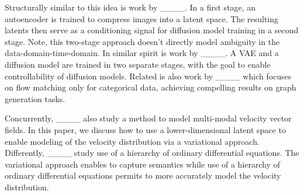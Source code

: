 Structurally similar to this idea is work by
____. In a first stage, an autoencoder is trained to compress images into a latent space. The resulting latents then serve as a conditioning signal for diffusion model training in a second stage. Note, this two-stage approach doesn't directly model ambiguity in the data-domain-time-domain. %
In similar spirit is work by ____. A VAE and a diffusion model are trained in two separate stages, with the goal to enable controllability of diffusion models. %
Related is also work by ____ which focuses on flow matching  only for categorical data, achieving compelling results on graph generation tasks. 

Concurrently, ____ also study a method to model multi-modal velocity vector fields. In this paper, we discuss how to use a lower-dimensional latent space to enable modeling of the velocity distribution via a variational approach. Differently, ____ study use of a hierarchy of ordinary differential equations. The variational approach enables to capture semantics while use of a hierarchy of ordinary differential equations permits to more accurately model the velocity distribution.